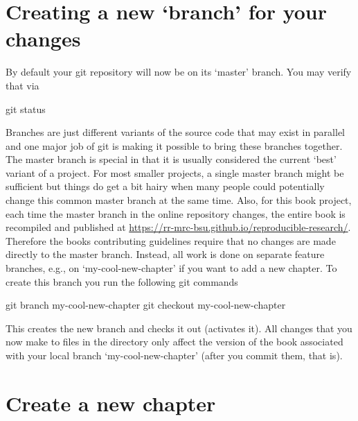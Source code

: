 \documentclass[]{book}
\newenvironment{Shaded}{\begin{snugshade}}{\end{snugshade}}
\newcommand{\FunctionTok}[1]{\textcolor[rgb]{0.00,0.00,0.00}{#1}}
\newcommand{\NormalTok}[1]{#1}
\begin{document}
\section{\texorpdfstring{Creating a new `branch' for your
changes}{Creating a new branch for your changes}}\label{creating-a-new-branch-for-your-changes}

By default your git repository will now be on its `master' branch. You
may verify that via

\begin{Shaded}
\begin{Highlighting}[]
\FunctionTok{git}\NormalTok{ status}
\end{Highlighting}
\end{Shaded}

Branches are just different variants of the source code that may exist
in parallel and one major job of git is making it possible to bring
these branches together. The master branch is special in that it is
usually considered the current `best' variant of a project. For most
smaller projects, a single master branch might be sufficient but things
do get a bit hairy when many people could potentially change this common
master branch at the same time. Also, for this book project, each time
the master branch in the online repository changes, the entire book is
recompiled and published at
\url{https://rr-mrc-bsu.github.io/reproducible-research/}. Therefore the
books contributing guidelines require that no changes are made directly
to the master branch. Instead, all work is done on separate feature
branches, e.g., on `my-cool-new-chapter' if you want to add a new
chapter. To create this branch you run the following git commands

\begin{Shaded}
\begin{Highlighting}[]
\FunctionTok{git}\NormalTok{ branch my-cool-new-chapter}
\FunctionTok{git}\NormalTok{ checkout my-cool-new-chapter}
\end{Highlighting}
\end{Shaded}

This creates the new branch and checks it out (activates it). All
changes that you now make to files in the directory only affect the
version of the book associated with your local branch
`my-cool-new-chapter' (after you commit them, that is).

\section{Create a new chapter}\label{create-a-new-chapter}
\end{document}
